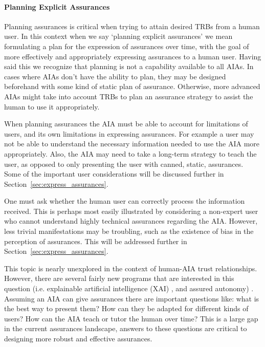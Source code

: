     \paragraph{Planning Explicit Assurances} Planning assurances is critical when trying to attain desired TRBs from a human user. In this context when we say `planning explicit assurances' we mean formulating a plan for the expression of assurances over time, with the goal of more effectively and appropriately expressing assurances to a human user. Having said this we recognize that planning is not a capability available to all AIAs. In cases where AIAs don't have the ability to plan, they may be designed beforehand with some kind of static plan of assurance. Otherwise, more advanced AIAs might take into account TRBs to plan an assurance strategy to assist the human to use it appropriately.

    When planning assurances the AIA must be able to account for limitations of users, and its own limitations in expressing assurances. For example a user may not be able to understand the necessary information needed to use the AIA more appropriately. Also, the AIA may need to take a long-term strategy to teach the user, as opposed to only presenting the user with canned, static, assurances. Some of the important user considerations will be discussed further in Section~\ref{sec:express_assurances}.
    
    One must ask whether the human user can correctly process the information received. This is perhaps most easily illustrated by considering a non-expert user who cannot understand highly technical assurances regarding the AIA. However, less trivial manifestations may be troubling, such as the existence of bias in the perception of assurances. This will be addressed further in Section~\ref{sec:express_assurances}.

    This topic is nearly unexplored in the context of human-AIA trust relationships. However, there are several fairly new programs that are interested in this question (i.e. explainable artificial intelligence (XAI) \cite{Gunning2017-ih}, and assured autonomy) . Assuming an AIA can give assurances there are important questions like: what is the best way to present them? How can they be adapted for different kinds of users? How can the AIA teach or tutor the human over time? This is a large gap in the current assurances landscape, answers to these questions are critical to designing more robust and effective assurances.

